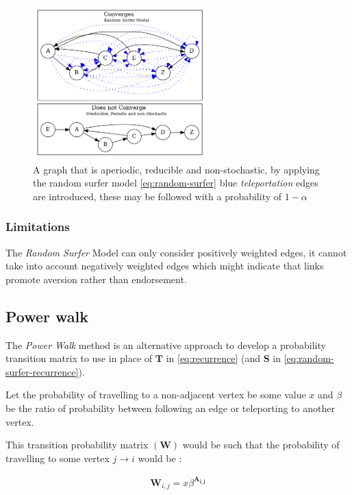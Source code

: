 \documentclass[11pt]{article}
\begin{document}
{
\begin{figure}
\includegraphics[width=0.6\textwidth]{media/dot/random_surfer.dot.png}
\caption{\label{fig:rseg}A graph that is aperiodic, reducible and non-stochastic, by applying the random surfer model \eqref{eq:random-surfer} blue \emph{teleportation} edges are introduced, these may be followed with a probability of \(1 - \alpha\)}
\end{figure}
}

\subsubsection{Limitations}
\label{sec:org725b0b3}
The \emph{Random Surfer} Model can only consider positively weighted edges, it cannot
take into account negatively weighted edges which might indicate that
links promote aversion rather than endorsement.
\subsection{Power walk}
\label{pwalk}
The \emph{Power Walk} method is an alternative approach to develop a probability
transition matrix to use in place of \(\mathbf{T}\) in \eqref{eq:recurrence} (and \(\mathbf{S}\) in \eqref{eq:random-surfer-recurrence}).

Let the probability of travelling to a non-adjacent vertex be some value \(x\)
and \(\beta\) be the ratio of probability between following an edge or
teleporting to another vertex.

This transition probability matrix \(\left( \mathbf{W}\right)\) would be such that the probability of
travelling to some vertex \(j \rightarrow i\) would be :

\begin{align}
\mathbf{W}_{i, j} = x\beta^{\mathbf{A_{i,j}}} \label{eq:prob-power-walk}
\end{align}
\end{document}
